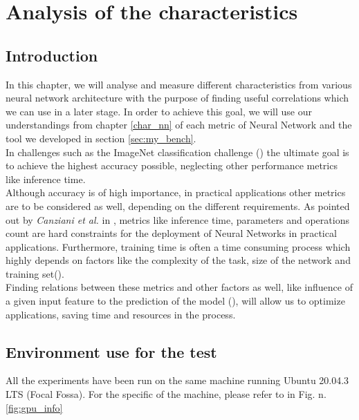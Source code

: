 \chapter{Analysis of the characteristics}\label{ana_char}
\section{Introduction}
In this chapter, we will analyse and measure different characteristics from various neural network architecture with the purpose of finding useful correlations which we can use in a later stage. In order to achieve this goal, we will use our understandings from chapter \ref{char_nn} of each metric of Neural Network and the tool we developed in section \ref{sec:my_bench}. \\
In challenges such as the ImageNet classification challenge (\cite{ILSVRC15}) the ultimate goal is to achieve the highest accuracy possible, neglecting other performance metrics like inference time. \cite{DBLP:journals/corr/CanzianiPC16}\\
Although accuracy is of high importance, in practical applications other metrics are to be considered as well, depending on the different requirements. As pointed out by \textit{Canziani et al.} in \cite{DBLP:journals/corr/CanzianiPC16}, metrics like inference time, parameters and operations count are hard constraints
for the deployment of Neural Networks in practical applications. Furthermore, training time is often a time consuming process which highly depends on factors like the complexity of the task, size of the network and training set(\cite{118273}). \\
Finding relations between these metrics and other factors as well, like influence of a given input feature to the prediction of the model (\cite{hooker2019benchmark}), will allow us to optimize applications, saving time and resources in the process.

\section{Environment use for the test}
All the experiments have been run on the same machine running Ubuntu 20.04.3 LTS (Focal Fossa). For the specific of the machine, please refer to in Fig. n. \ref{fig:gpu_info}


